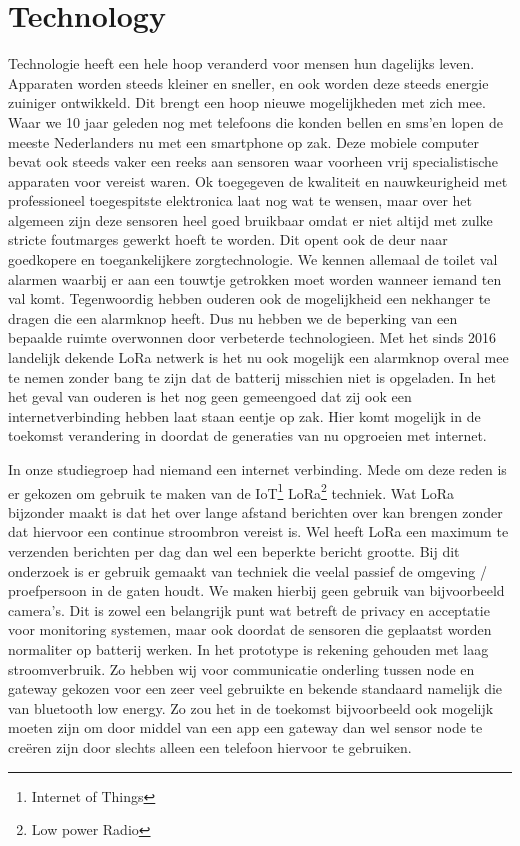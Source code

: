 \documentclass{below-ext}
\begin{document}
\section{Technology}
Technologie heeft een hele hoop veranderd voor mensen hun dagelijks leven. Apparaten worden steeds kleiner en sneller, en ook worden deze steeds energie zuiniger ontwikkeld. Dit brengt een hoop nieuwe mogelijkheden met zich mee. Waar we 10 jaar geleden nog met telefoons die konden bellen en sms'en lopen de meeste Nederlanders nu met een smartphone op zak. Deze mobiele computer bevat ook steeds vaker een reeks aan sensoren waar voorheen vrij specialistische apparaten voor vereist waren. Ok toegegeven de kwaliteit en nauwkeurigheid met professioneel toegespitste elektronica laat nog wat te wensen, maar over het algemeen zijn deze sensoren heel goed bruikbaar omdat er niet altijd met zulke stricte foutmarges gewerkt hoeft te worden. Dit opent ook de deur naar goedkopere en toegankelijkere zorgtechnologie. We kennen allemaal de toilet val alarmen waarbij er aan een touwtje getrokken moet worden wanneer iemand ten val komt. 
Tegenwoordig hebben ouderen ook de mogelijkheid een nekhanger te dragen die een alarmknop heeft. 
Dus nu hebben we de beperking van een bepaalde ruimte overwonnen door verbeterde technologieen. Met het sinds 2016 landelijk dekende LoRa netwerk is het nu ook mogelijk een alarmknop overal mee te nemen zonder bang te zijn dat de batterij misschien niet is opgeladen. In het het geval van ouderen is het nog geen gemeengoed dat zij ook een internetverbinding hebben laat staan eentje op zak. Hier komt mogelijk in de toekomst verandering in doordat de generaties van nu opgroeien met internet.
 
In onze studiegroep had niemand een internet verbinding. Mede om deze reden is er gekozen om gebruik te maken van de IoT\footnote{Internet of Things} LoRa\footnote{Low power Radio} techniek. Wat LoRa bijzonder maakt is dat het over lange afstand berichten over kan brengen zonder dat hiervoor een continue stroombron vereist is. Wel heeft LoRa een maximum te verzenden berichten per dag dan wel een beperkte bericht grootte. Bij dit onderzoek is er gebruik gemaakt van techniek die veelal passief de omgeving / proefpersoon in de gaten houdt. We maken hierbij geen gebruik van bijvoorbeeld camera's. Dit is zowel een belangrijk punt wat betreft de privacy en acceptatie voor monitoring systemen, maar ook doordat de sensoren die geplaatst worden normaliter op batterij werken. In het prototype is rekening gehouden met laag stroomverbruik. Zo hebben wij voor communicatie onderling tussen node en gateway gekozen voor een zeer veel gebruikte en bekende standaard namelijk die van bluetooth low energy. Zo zou het in de toekomst bijvoorbeeld ook mogelijk moeten zijn om door middel van een app een gateway dan wel sensor node te creëren zijn door slechts alleen een telefoon hiervoor te gebruiken. 
\end{document}
